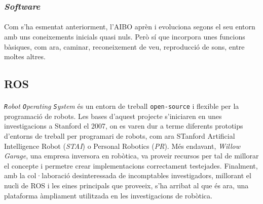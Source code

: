 \documentclass[12pt,a4paper,final,twoside]{article}
\begin{document}
\subsubsection{\textit{Software}} 
\paragraph{}Com s'ha esmentat anteriorment, l'AIBO aprèn i evoluciona segons el seu entorn amb uns coneixements inicials quasi nuls. Però sí que incorpora unes funcions bàsiques, com ara, caminar, reconeixement de veu, reproducció de sons, entre moltes altres. 


  


\subsection{ROS}
\label{ROS}
\paragraph{}\textit{\texttt{R}obot \texttt{O}perating \texttt{S}ystem} \cite{ROS} és un entorn de treball \texttt{open-source} i flexible per la programació de robots. Les bases d'aquest projecte s'iniciaren en unes investigacions a Stanford el 2007, on es varen dur a terme diferents prototips d'entorns de treball per programari de robots, com ara STanford Artificial Intelligence Robot (\textit{STAI}) o Personal Robotics (\textit{PR}). Més endavant, \textit{Willow Garage}, una empresa inversora en robòtica, va proveir recursos per tal de millorar el concepte i permetre crear implementacions correctament testejades. Finalment, amb la col·laboració desinteressada de incomptables investigadors, millorant el nucli de ROS i les eines principals que proveeix, s'ha arribat al que és ara, una plataforma àmpliament utilitzada en les investigacions de robòtica.
\end{document}

